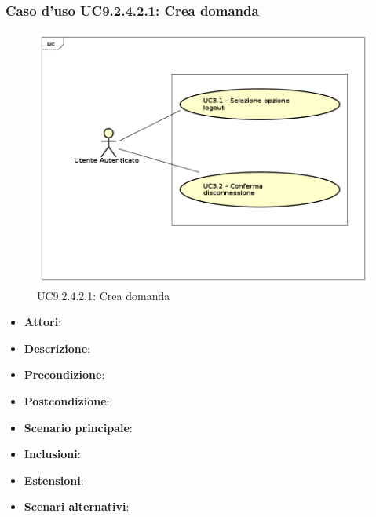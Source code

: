 				\subsubsection{Caso d'uso UC9.2.4.2.1: Crea domanda}
				\label{UC9.2.4.2.1}
				\begin{figure}[h]
					\centering
				\includegraphics[scale=0.7,keepaspectratio]{UML/UC9.png}
					\caption{UC9.2.4.2.1: Crea domanda}
				\end{figure}
				\FloatBarrier
				\begin{itemize}
					\item \textbf{Attori}: 
					\item \textbf{Descrizione}: 
					\item \textbf{Precondizione}: 
					\item \textbf{Postcondizione}: 
					\item \textbf{Scenario principale}:
					\item \textbf{Inclusioni}:
					\item \textbf{Estensioni}:
					\item \textbf{Scenari alternativi}:
				\end{itemize}
				
